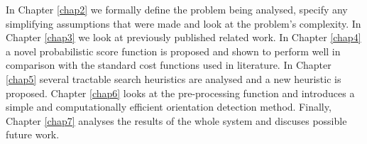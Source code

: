 In Chapter \ref{chap2} we formally define the problem being analysed, specify any simplifying assumptions that were made and look at the problem's complexity. In Chapter \ref{chap3} we look at previously published related work. In Chapter \ref{chap4} a novel probabilistic score function is proposed and shown to perform well in comparison with the standard cost functions used in literature. In Chapter \ref{chap5} several tractable search heuristics are analysed and a new heuristic is proposed. Chapter \ref{chap6} looks at the pre-processing function and introduces a simple and computationally efficient orientation detection method. Finally, Chapter \ref{chap7} analyses the results of the whole system and discuses possible future work.
